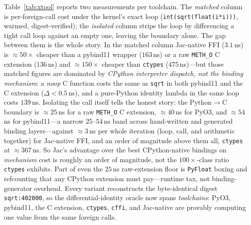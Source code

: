 \documentclass[conference]{IEEEtran}
\newcommand{\code}[1]{\texttt{#1}}
\begin{document}
Table~\ref{tab:xtool} reports two measurements per toolchain. The \emph{matched}
column is per-foreign-call cost under the kernel's exact loop
(\code{int(sqrt(float(i*i)))}, warmed, digest-verified); the \emph{isolated}
column strips the loop by differencing a tight call loop against an empty one,
leaving the boundary alone. The gap between them is the whole story. In the
matched column Jac-native FFI ($3.1$\,ns) is $\approx$$50\times$ cheaper than a
pybind11 wrapper ($163$\,ns) or a raw \code{METH\_O} C extension ($136$\,ns) and
$\approx$$150\times$ cheaper than \code{ctypes} ($475$\,ns)---but those matched
figures are dominated by \emph{CPython interpreter dispatch, not the binding
mechanism}: a \emph{noop} C function costs the same as \code{sqrt} in both
pybind11 and the C extension ($\Delta<0.5$\,ns), and a pure-Python identity
lambda in the same loop costs $139$\,ns. Isolating the call itself tells the
honest story: the Python$\rightarrow$C boundary is $\approx$$25$\,ns for a raw
\code{METH\_O} C extension, $\approx$$40$\,ns for PyO3, and $\approx$$54$\,ns for
pybind11---a narrow $25$--$54$\,ns band across hand-written and generated binding
layers---against $\approx$$3$\,ns per whole iteration (loop, call, and arithmetic
together) for Jac-native FFI, and an order of magnitude above them all,
\code{ctypes} at $\approx$$367$\,ns. So Jac's advantage over the best CPython-native
bindings on \emph{mechanism} cost is roughly an order of magnitude, not the
$100\times$-class ratio \code{ctypes} exhibits. Part of even the $25$\,ns
raw-extension floor is \code{PyFloat} boxing and refcounting that any CPython
extension must pay---runtime tax, not binding-generator overhead. Every variant
reconstructs the byte-identical digest \code{sqrt:402000}, so the
differential-identity oracle now spans \emph{toolchains}: PyO3, pybind11, the C
extension, \code{ctypes}, \code{cffi}, and Jac-native are provably computing one
value from the same foreign calls.
\end{document}
